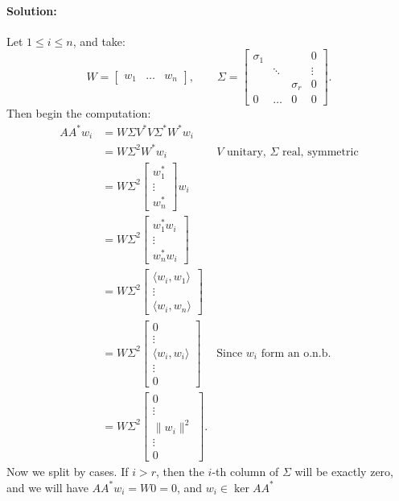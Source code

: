 \documentclass{article}
\begin{document}
\begin{enumerate}
    \paragraph{Solution: }Let $1\leq i \leq n$, and take:
    \[ W= \begin{bmatrix} w_1&\dots&w_n \end{bmatrix},\quad \quad 
    \Sigma=
    \begin{bmatrix} \sigma_{1}&&&0 \\
    &\ddots &&\vdots \\
    &&\sigma_r&0 \\
    0&\dots&0&0
    \end{bmatrix} .\] 
    Then begin the computation:
    \begin{align*}
        A A^* w_i&= W\Sigma V^* V \Sigma^* W^* w_i \\
                 &= W\Sigma^2W^*w_i &\text{$V$ unitary, $\Sigma$ real, symmetric} \\
                 &= W\Sigma^2\begin{bmatrix} w_1^* \\\vdots \\ w_n^*  \end{bmatrix}w_i  \\
                 &= W\Sigma^2\begin{bmatrix} w_1^*w_i \\\vdots \\ w_n^* w_i \end{bmatrix}\\
                 &= W\Sigma^2\begin{bmatrix} \langle w_i,w_1 \rangle \\\vdots \\ \langle w_i,w_n \rangle \end{bmatrix}\\
                 &= W\Sigma^2\begin{bmatrix} 0\\ \vdots\\ \langle w_i,w_i \rangle\\ \vdots \\ 0 \end{bmatrix}&\text{Since $w_i$ form an o.n.b.}\\
                 &= W\Sigma^2\begin{bmatrix} 0\\ \vdots\\ \|w_i\|^2\\ \vdots \\ 0 \end{bmatrix}
    .\end{align*}
    Now we split by cases. If $i>r$, then the  $i$-th column of $\Sigma$ will be exactly zero, and we will have $A A^* w_i=W0=0$, and $w_i\in \ker A A^* $%


\end{enumerate}
\end{document}
